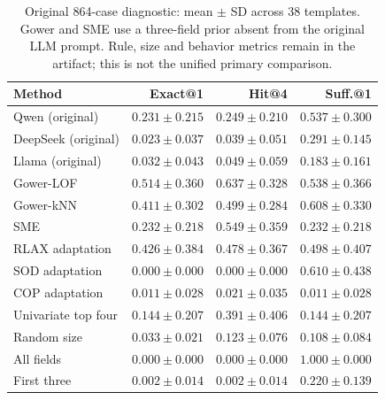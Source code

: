 \begin{table}[t]
\centering\footnotesize
\caption{Original 864-case diagnostic: mean $\pm$ SD across 38 templates. Gower and SME use a three-field prior absent from the original LLM prompt. Rule, size and behavior metrics remain in the artifact; this is not the unified primary comparison.}
\setlength{\tabcolsep}{3pt}
\renewcommand{\arraystretch}{1.12}
\begin{tabular}{lrrr}
\toprule
Method & Exact@1 & Hit@4 & Suff.@1 \\
\midrule
Qwen (original) & $0.231\!\pm\!0.215$ & $0.249\!\pm\!0.210$ & $0.537\!\pm\!0.300$ \\
DeepSeek (original) & $0.023\!\pm\!0.037$ & $0.039\!\pm\!0.051$ & $0.291\!\pm\!0.145$ \\
Llama (original) & $0.032\!\pm\!0.043$ & $0.049\!\pm\!0.059$ & $0.183\!\pm\!0.161$ \\
Gower-LOF & $0.514\!\pm\!0.360$ & $0.637\!\pm\!0.328$ & $0.538\!\pm\!0.366$ \\
Gower-kNN & $0.411\!\pm\!0.302$ & $0.499\!\pm\!0.284$ & $0.608\!\pm\!0.330$ \\
SME & $0.232\!\pm\!0.218$ & $0.549\!\pm\!0.359$ & $0.232\!\pm\!0.218$ \\
RLAX adaptation & $0.426\!\pm\!0.384$ & $0.478\!\pm\!0.367$ & $0.498\!\pm\!0.407$ \\
SOD adaptation & $0.000\!\pm\!0.000$ & $0.000\!\pm\!0.000$ & $0.610\!\pm\!0.438$ \\
COP adaptation & $0.011\!\pm\!0.028$ & $0.021\!\pm\!0.035$ & $0.011\!\pm\!0.028$ \\
Univariate top four & $0.144\!\pm\!0.207$ & $0.391\!\pm\!0.406$ & $0.144\!\pm\!0.207$ \\
Random size & $0.033\!\pm\!0.021$ & $0.123\!\pm\!0.076$ & $0.108\!\pm\!0.084$ \\
All fields & $0.000\!\pm\!0.000$ & $0.000\!\pm\!0.000$ & $1.000\!\pm\!0.000$ \\
First three & $0.002\!\pm\!0.014$ & $0.002\!\pm\!0.014$ & $0.220\!\pm\!0.139$ \\
\bottomrule
\end{tabular}
\renewcommand{\arraystretch}{1.0}
\label{tab:original}
\end{table}
